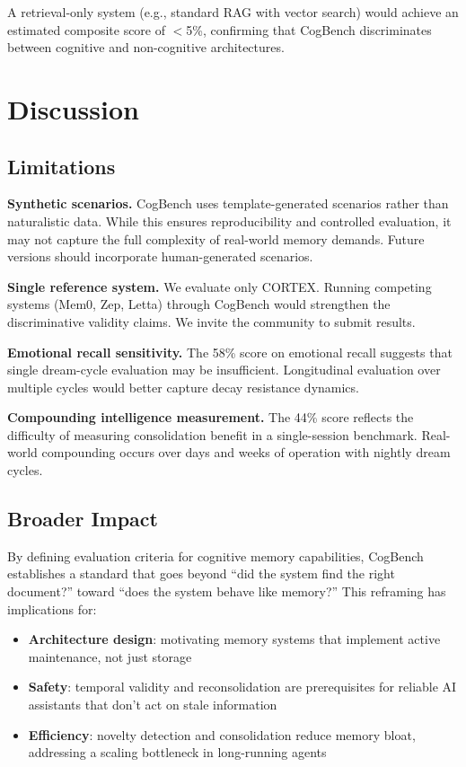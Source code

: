 \documentclass{article}
\begin{document}
A retrieval-only system (e.g., standard RAG with vector search) would achieve an estimated composite score of $<$5\%, confirming that CogBench discriminates between cognitive and non-cognitive architectures.

\section{Discussion}
\label{sec:discussion}

\subsection{Limitations}

\textbf{Synthetic scenarios.} CogBench uses template-generated scenarios rather than naturalistic data. While this ensures reproducibility and controlled evaluation, it may not capture the full complexity of real-world memory demands. Future versions should incorporate human-generated scenarios.

\textbf{Single reference system.} We evaluate only CORTEX. Running competing systems (Mem0, Zep, Letta) through CogBench would strengthen the discriminative validity claims. We invite the community to submit results.

\textbf{Emotional recall sensitivity.} The 58\% score on emotional recall suggests that single dream-cycle evaluation may be insufficient. Longitudinal evaluation over multiple cycles would better capture decay resistance dynamics.

\textbf{Compounding intelligence measurement.} The 44\% score reflects the difficulty of measuring consolidation benefit in a single-session benchmark. Real-world compounding occurs over days and weeks of operation with nightly dream cycles.

\subsection{Broader Impact}

By defining evaluation criteria for cognitive memory capabilities, CogBench establishes a standard that goes beyond ``did the system find the right document?'' toward ``does the system behave like memory?'' This reframing has implications for:

\begin{itemize}[nosep]
  \item \textbf{Architecture design}: motivating memory systems that implement active maintenance, not just storage
  \item \textbf{Safety}: temporal validity and reconsolidation are prerequisites for reliable AI assistants that don't act on stale information
  \item \textbf{Efficiency}: novelty detection and consolidation reduce memory bloat, addressing a scaling bottleneck in long-running agents
\end{itemize}
\end{document}
